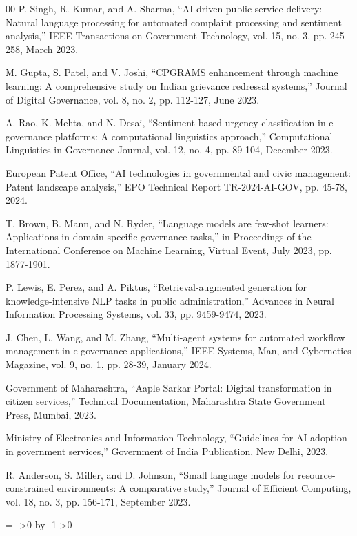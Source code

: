 \documentclass[conference]{IEEEtran}
\begin{document}
\begin{thebibliography}{00}
 P. Singh, R. Kumar, and A. Sharma, ``AI-driven public service delivery: Natural language processing for automated complaint processing and sentiment analysis,'' IEEE Transactions on Government Technology, vol. 15, no. 3, pp. 245-258, March 2023.

 M. Gupta, S. Patel, and V. Joshi, ``CPGRAMS enhancement through machine learning: A comprehensive study on Indian grievance redressal systems,'' Journal of Digital Governance, vol. 8, no. 2, pp. 112-127, June 2023.

 A. Rao, K. Mehta, and N. Desai, ``Sentiment-based urgency classification in e-governance platforms: A computational linguistics approach,'' Computational Linguistics in Governance Journal, vol. 12, no. 4, pp. 89-104, December 2023.

 European Patent Office, ``AI technologies in governmental and civic management: Patent landscape analysis,'' EPO Technical Report TR-2024-AI-GOV, pp. 45-78, 2024.

 T. Brown, B. Mann, and N. Ryder, ``Language models are few-shot learners: Applications in domain-specific governance tasks,'' in Proceedings of the International Conference on Machine Learning, Virtual Event, July 2023, pp. 1877-1901.

 P. Lewis, E. Perez, and A. Piktus, ``Retrieval-augmented generation for knowledge-intensive NLP tasks in public administration,'' Advances in Neural Information Processing Systems, vol. 33, pp. 9459-9474, 2023.

 J. Chen, L. Wang, and M. Zhang, ``Multi-agent systems for automated workflow management in e-governance applications,'' IEEE Systems, Man, and Cybernetics Magazine, vol. 9, no. 1, pp. 28-39, January 2024.

 Government of Maharashtra, ``Aaple Sarkar Portal: Digital transformation in citizen services,'' Technical Documentation, Maharashtra State Government Press, Mumbai, 2023.

 Ministry of Electronics and Information Technology, ``Guidelines for AI adoption in government services,'' Government of India Publication, New Delhi, 2023.

 R. Anderson, S. Miller, and D. Johnson, ``Small language models for resource-constrained environments: A comparative study,'' Journal of Efficient Computing, vol. 18, no. 3, pp. 156-171, September 2023.
\end{thebibliography}

\clearpage
\newcommand{\AddEmptyPagesTo}[1]{%
    \begingroup
    \count0=\numexpr#1-\value{page}\relax
    \ifnum\count0>0
        \loop\thispagestyle{empty}\mbox{}\newpage
        \advance\count0 by -1
    \ifnum{}>0
        \repeat
    \fi
    \endgroup
}
\AddEmptyPagesTo{9}
\end{document}
